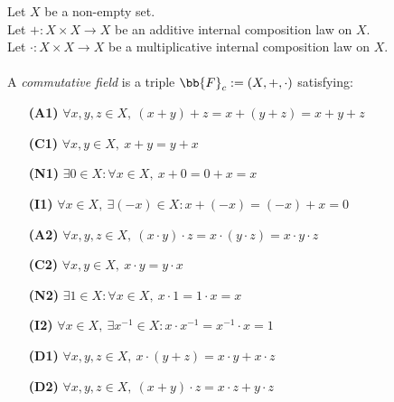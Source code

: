\begin{definition-pre}
    \label{def:commutative_field}
    Let \(X\) be a non-empty set. \\
    Let \(+: X\times X \to X\) be an additive internal composition law on \(X\). \\
    Let \(\cdot: X\times X \to X\) be a multiplicative internal composition law on \(X\). \\\\
    A \textit{commutative field} is a triple \(\bb{F}_c:= (X, +, \cdot)\) satisfying:
    \begin{enumerate}
        \item [\textbf{(A1)}] \(\forall x,y,z\in X,\ (x+y)+z= x+(y+z) = x+y+z\)
        \item [\textbf{(C1)}] \(\forall x,y\in X,\ x+y = y+x\)
        \item [\textbf{(N1)}] \(\exists 0 \in X : \forall x \in X,\ x+0 = 0+x = x\)
        \item [\textbf{(I1)}] \(\forall x \in X,\ \exists (-x)\in X: x+(-x) = (-x)+x = 0\)
        \item [\textbf{(A2)}] \(\forall x,y,z\in X,\ (x\cdot y)\cdot z= x\cdot(y\cdot z) = x\cdot y\cdot z\)
        \item [\textbf{(C2)}] \(\forall x,y\in X,\ x\cdot y = y\cdot x\)
        \item [\textbf{(N2)}] \(\exists 1 \in X : \forall x \in X,\ x\cdot1 = 1\cdot x = x\)
        \item [\textbf{(I2)}] \(\forall x \in X,\ \exists x^{-1}\in X: x\cdot x^{-1} = x^{-1}\cdot x = 1\)
        \item [\textbf{(D1)}] \(\forall x,y,z \in X,\ x\cdot(y+z)=x\cdot y+x\cdot z\)
        \item [\textbf{(D2)}] \(\forall x,y,z \in X,\ (x+y)\cdot z=x\cdot z+y\cdot z\)
    \end{enumerate}
\end{definition-pre}

\begin{definition-pre}
    \label{def:number_field}
\end{definition-pre}

\begin{definition-pre}
    \label{def:fundamental_system}
\end{definition-pre}

\begin{definition-pre}[Unit]
    \label{def:unit}
\end{definition-pre}
\begin{definition-pre}
    \label{def:primitive_root_of_unity}
\end{definition-pre}

